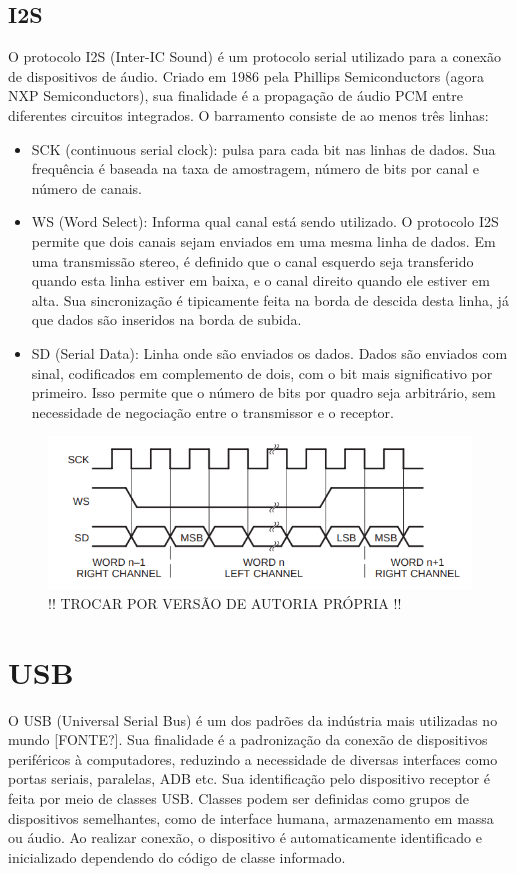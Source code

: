 \subsection{I2S}
O protocolo I2S (Inter-IC Sound) é um protocolo serial utilizado para a conexão de dispositivos de áudio. Criado em 1986 pela Phillips Semiconductors (agora NXP Semiconductors), sua finalidade é a  propagação de áudio PCM entre diferentes circuitos integrados.
O barramento consiste de ao menos três linhas:
\begin{itemize}
    \item SCK (continuous serial clock): pulsa para cada bit nas linhas de dados. Sua frequência é baseada na taxa de amostragem, número de bits por canal e número de canais.
    \item WS (Word Select): Informa qual canal está sendo utilizado. O protocolo I2S permite que dois canais sejam enviados em uma mesma linha de dados. Em uma transmissão stereo, é definido que o canal esquerdo seja transferido quando esta linha estiver em baixa, e o canal direito quando ele estiver em alta. Sua sincronização é tipicamente feita na borda de descida desta linha, já que dados são inseridos na borda de subida.
    \item SD (Serial Data): Linha onde são enviados os dados. Dados são enviados com sinal, codificados em complemento de dois, com o bit mais significativo por primeiro. Isso permite que o número de bits por quadro seja arbitrário, sem necessidade de negociação entre o transmissor e o receptor.
\end{itemize}
\begin{figure}[!h]
    \includegraphics[scale=0.5]{figuras/i2s-bus.png}
    \caption{!! TROCAR POR VERSÃO DE AUTORIA PRÓPRIA !!}
    \label{fig:circularBuffer}
\end{figure}

\section{USB}
O USB (Universal Serial Bus) é um dos padrões da indústria mais utilizadas no mundo [FONTE?]. Sua finalidade é a padronização da conexão de dispositivos periféricos à computadores, reduzindo a necessidade de diversas interfaces como portas seriais, paralelas, ADB etc. 
Sua identificação pelo dispositivo receptor é feita por meio de classes USB. Classes podem ser definidas como grupos de dispositivos semelhantes, como de interface humana, armazenamento em massa ou áudio. Ao realizar conexão, o dispositivo é automaticamente identificado e inicializado dependendo do código de classe informado.

